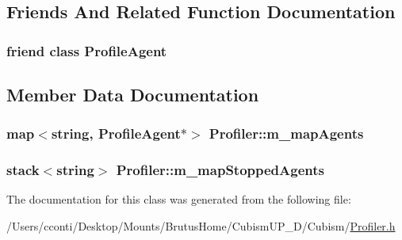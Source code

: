 \subsection{Friends And Related Function Documentation}
\hypertarget{class_profiler_a92aee0ec8225cca509a1c268317672d1}{}
\subsubsection[{Profile\+Agent}]{\setlength{\rightskip}{0pt plus 5cm}friend class {\bf Profile\+Agent}\hspace{0.3cm}{\ttfamily [friend]}}\label{class_profiler_a92aee0ec8225cca509a1c268317672d1}


\subsection{Member Data Documentation}
\hypertarget{class_profiler_a289df33e2c71075ff9bf2d2c3e180c02}{}
\subsubsection[{m\+\_\+map\+Agents}]{\setlength{\rightskip}{0pt plus 5cm}map$<$string, {\bf Profile\+Agent}$\ast$$>$ Profiler\+::m\+\_\+map\+Agents\hspace{0.3cm}{\ttfamily [protected]}}\label{class_profiler_a289df33e2c71075ff9bf2d2c3e180c02}
\hypertarget{class_profiler_a898eec43a1f9c8ed482d169e90f4a7bd}{}
\subsubsection[{m\+\_\+map\+Stopped\+Agents}]{\setlength{\rightskip}{0pt plus 5cm}stack$<$string$>$ Profiler\+::m\+\_\+map\+Stopped\+Agents\hspace{0.3cm}{\ttfamily [protected]}}\label{class_profiler_a898eec43a1f9c8ed482d169e90f4a7bd}


The documentation for this class was generated from the following file\+:\begin{DoxyCompactItemize}
\item 
/\+Users/cconti/\+Desktop/\+Mounts/\+Brutus\+Home/\+Cubism\+U\+P\+\_\+D/\+Cubism/\hyperlink{_profiler_8h}{Profiler.\+h}\end{DoxyCompactItemize}
